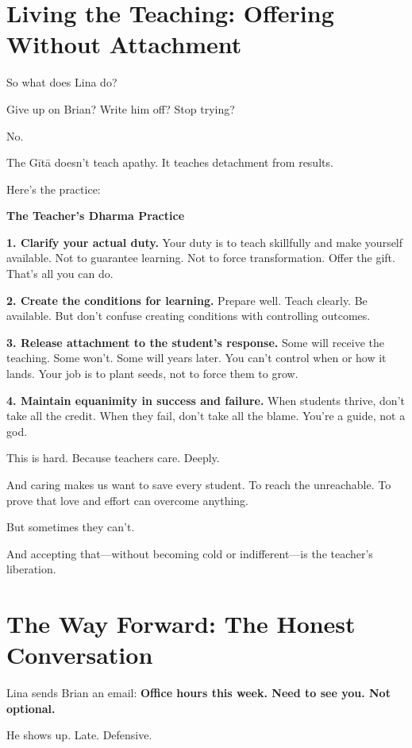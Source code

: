 \documentclass[11pt,twoside]{book}
\begin{document}
\section*{Living the Teaching: Offering Without Attachment}

So what does Lina do?

Give up on Brian? Write him off? Stop trying?

No.

The Gītā doesn't teach apathy. It teaches detachment from results.

Here's the practice:

\begin{practicebox}
\textbf{The Teacher's Dharma Practice}

\textbf{1. Clarify your actual duty.}
Your duty is to teach skillfully and make yourself available. Not to guarantee learning. Not to force transformation. Offer the gift. That's all you can do.

\textbf{2. Create the conditions for learning.}
Prepare well. Teach clearly. Be available. But don't confuse creating conditions with controlling outcomes.

\textbf{3. Release attachment to the student's response.}
Some will receive the teaching. Some won't. Some will years later. You can't control when or how it lands. Your job is to plant seeds, not to force them to grow.

\textbf{4. Maintain equanimity in success and failure.}
When students thrive, don't take all the credit. When they fail, don't take all the blame. You're a guide, not a god.
\end{practicebox}

This is hard. Because teachers care. Deeply.

And caring makes us want to save every student. To reach the unreachable. To prove that love and effort can overcome anything.

But sometimes they can't.

And accepting that—without becoming cold or indifferent—is the teacher's liberation.

\section*{The Way Forward: The Honest Conversation}

Lina sends Brian an email: \textbf{Office hours this week. Need to see you. Not optional.}

He shows up. Late. Defensive.
\end{document}
